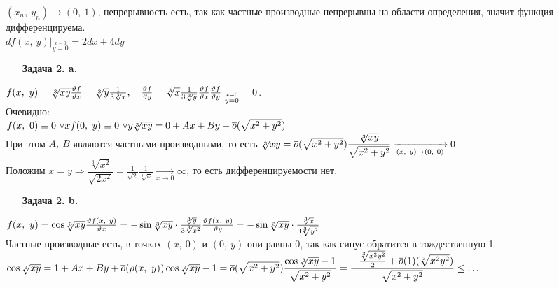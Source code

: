 \documentclass[12pt, letterpaper, twoside]{article}
\begin{document}
    $(x_n,\ y_n)\to (0,\ 1)$, непрерывность есть, так как частные производные непрерывны на области определения, значит функция дифференцируема.\\
    $df(x,\ y)\big|_{\overset{x = 0}{y=0}} = 2dx + 4dy$
    \begin{enumerate}
        \item[\textbf{Задача 2. a.}]
    \end{enumerate}
    $f(x,\ y) = \sqrt[3]{xy}\\
    \frac{\vartheta f}{\vartheta x} = \sqrt[3]{y}\frac{1}{3\sqrt[3]{x}},\quad \frac{\vartheta f}{\vartheta y} = \sqrt[3]{x}\frac{1}{3\sqrt[3]{y}}\\
    \frac{\vartheta f}{\vartheta x}\frac{\vartheta f}{\vartheta y}\big|_{\overset{x=0}{y=0}} = 0$.\\
    Очевидно:\\
    $f(x,\ 0) \equiv 0\ \forall x\\
    f(0,\ y) \equiv 0\ \forall y\\
    \sqrt[3]{xy} = 0 + Ax + By + \overline{o}(\sqrt{x^2 + y^2})$\\
    При этом $A,\ B$ являются частными производными, то есть
    $\sqrt[3]{xy} = \overline{o}(\sqrt{x^2 + y^2})\\
    \dfrac{\sqrt[3]{xy}}{\sqrt{x^2 + y^2}}\xrightarrow[(x,\ y)\to(0,\ 0)]{}0$\\
    Положим $x = y\Rightarrow \dfrac{\sqrt[3]{x^2}}{\sqrt{2x^2}} = \frac{1}{\sqrt{2}}\frac{1}{\sqrt[3]{x}}\xrightarrow[x\to 0]{} \infty$, то есть дифференцируемости нет.
    \begin{enumerate}
        \item[\textbf{Задача 2. b.}]
    \end{enumerate}
    $f(x,\ y) = \cos \sqrt[3]{xy}\\
    \frac{\vartheta f(x,\ y)}{\vartheta x} = -\sin \sqrt[3]{xy}\cdot \frac{\sqrt[3]{y}}{3\sqrt[3]{x^2}}\\
    \frac{\vartheta f(x,\ y)}{\vartheta y} = -\sin \sqrt[3]{xy}\cdot \frac{\sqrt[3]{x}}{3\sqrt[3]{y^2}}$\\
    Частные производные есть, в точках $(x,\ 0)$ и $(0,\ y)$ они равны 0, так как синус обратится в тождественную 1.\\
    $\cos \sqrt[3]{xy} = 1 + Ax + By + \overline{o}(\rho(x,\ y))\\
    \cos\sqrt[3]{xy} - 1 = \overline{o}(\sqrt{x^2 + y^2})\\
    \dfrac{\cos \sqrt[3]{xy} - 1}{\sqrt{x^2 + y^2}} = \dfrac{-\frac{\sqrt[3]{x^2y^2}}{2} + \overline{o}(1)(\sqrt[3]{x^2y^2})}{\sqrt{x^2 + y^2}}\leq \dots$\\
\end{document}
